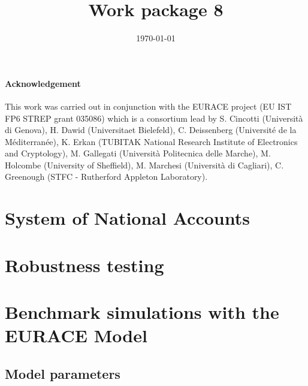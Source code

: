 \documentclass[a4paper,11pt]{book}
\begin{document}
\title{Work package 8}
\author{}
\date{\today}
\maketitle
\tableofcontents

\subsubsection*{Acknowledgement}
This work was carried out in conjunction with the EURACE project (EU IST FP6
STREP grant 035086) which is a consortium lead by S. Cincotti (Universit\`{a} di
Genova), H. Dawid (Universitaet Bielefeld), C. Deissenberg (Universit\'{e} de la
M\'{e}diterran\'{e}e), K. Erkan (TUBITAK National Research Institute of Electronics
and Cryptology), M. Gallegati  (Universit\`{a} Politecnica delle Marche), M.
Holcombe (University of Sheffield), M. Marchesi (Universit\`{a} di Cagliari), C.
Greenough (STFC - Rutherford Appleton Laboratory).


\chapter{System of National Accounts}


%

\chapter{Robustness testing}
%

\chapter{Benchmark simulations with the EURACE Model}


\begin{appendix}
\chapter{Model parameters}

\end{appendix}

%
%
\end{document}
